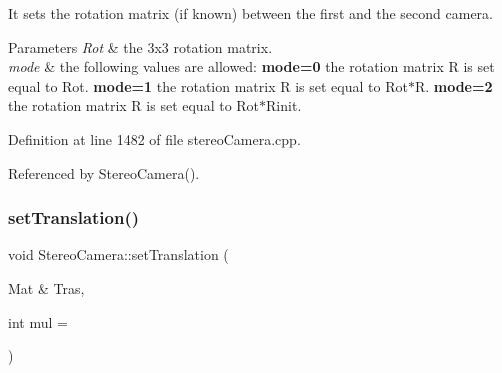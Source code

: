 It sets the rotation matrix (if known) between the first and the second camera. 


\begin{DoxyParams}{Parameters}
{\em Rot} & the 3x3 rotation matrix. \\
\hline
{\em mode} & the following values are allowed\+: {\bfseries{mode=0}} the rotation matrix R is set equal to Rot. {\bfseries{mode=1}} the rotation matrix R is set equal to Rot$\ast$R. {\bfseries{mode=2}} the rotation matrix R is set equal to Rot$\ast$\+Rinit. \\
\hline
\end{DoxyParams}


Definition at line 1482 of file stereo\+Camera.\+cpp.


\begin{DoxyCode}{0}

\end{DoxyCode}


Referenced by Stereo\+Camera().

\mbox{\label{classStereoCamera_a7b10f1218e8e70f47b22080ba1820d39}} 
\subsubsection{\texorpdfstring{setTranslation()}{setTranslation()}}
{\footnotesize\ttfamily void Stereo\+Camera\+::set\+Translation (\begin{DoxyParamCaption}\item[{Mat \&}]{Tras,  }\item[{int}]{mul = {} }\end{DoxyParamCaption})}



